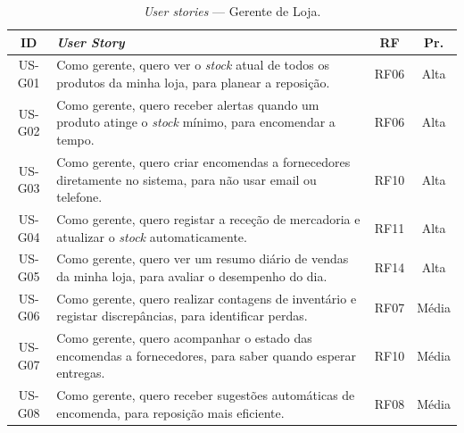     \begin{table}[H]
    \centering
    \small
    \begin{tabular}{|c|p{8.5cm}|c|c|}
    \hline
    \textbf{ID} & \textbf{\textit{User Story}} & \textbf{RF} & \textbf{Pr.} \\
    \hline
    US-G01 & Como gerente, quero ver o \textit{stock} atual de todos os produtos da minha loja, para planear a reposição. & RF06 & Alta \\
    \hline
    US-G02 & Como gerente, quero receber alertas quando um produto atinge o \textit{stock} mínimo, para encomendar a tempo. & RF06 & Alta \\
    \hline
    US-G03 & Como gerente, quero criar encomendas a fornecedores diretamente no sistema, para não usar email ou telefone. & RF10 & Alta \\
    \hline
    US-G04 & Como gerente, quero registar a receção de mercadoria e atualizar o \textit{stock} automaticamente. & RF11 & Alta \\
    \hline
    US-G05 & Como gerente, quero ver um resumo diário de vendas da minha loja, para avaliar o desempenho do dia. & RF14 & Alta \\
    \hline
    US-G06 & Como gerente, quero realizar contagens de inventário e registar discrepâncias, para identificar perdas. & RF07 & Média \\
    \hline
    US-G07 & Como gerente, quero acompanhar o estado das encomendas a fornecedores, para saber quando esperar entregas. & RF10 & Média \\
    \hline
    US-G08 & Como gerente, quero receber sugestões automáticas de encomenda, para reposição mais eficiente. & RF08 & Média \\
    \hline
    \end{tabular}
    \caption{\textit{User stories} --- Gerente de Loja.}
    \label{tab:us_gerente}
    \end{table}

